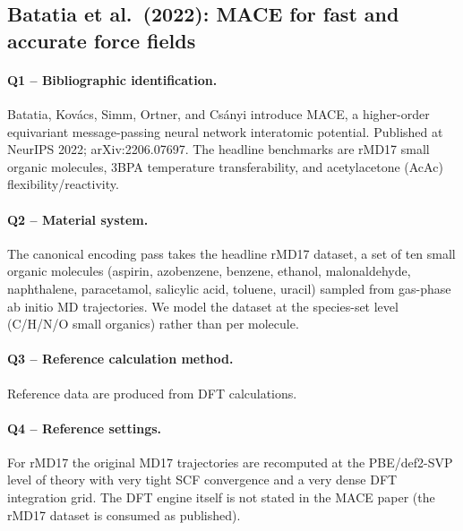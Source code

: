 \subsection{Batatia et al.\ (2022): MACE for fast and accurate force fields}
\label{sec:appendix-example-batatia2022}

\paragraph{Q1 -- Bibliographic identification.}
Batatia, Kov\'acs, Simm, Ortner, and Cs\'anyi introduce MACE, a
higher-order equivariant message-passing neural network interatomic
potential. Published at NeurIPS 2022; arXiv:2206.07697. The headline
benchmarks are rMD17 small organic molecules, 3BPA temperature
transferability, and acetylacetone (AcAc) flexibility/reactivity.


\paragraph{Q2 -- Material system.}
The canonical encoding pass takes the headline rMD17 dataset, a set
of ten small organic molecules (aspirin, azobenzene, benzene,
ethanol, malonaldehyde, naphthalene, paracetamol, salicylic acid,
toluene, uracil) sampled from gas-phase ab initio MD trajectories.
We model the dataset at the species-set level (C/H/N/O small
organics) rather than per molecule.


\paragraph{Q3 -- Reference calculation method.}
Reference data are produced from DFT calculations.


\paragraph{Q4 -- Reference settings.}
For rMD17 the original MD17 trajectories are recomputed at the
PBE/def2-SVP level of theory with very tight SCF convergence and a
very dense DFT integration grid. The DFT engine itself is not stated
in the MACE paper (the rMD17 dataset is consumed as published).


